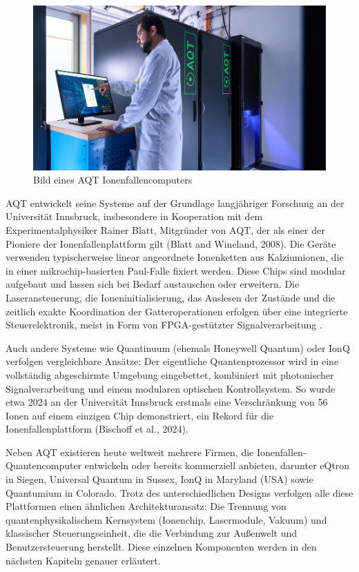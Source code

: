     \begin{figure}[ht]
    \centering
    \includegraphics[width=1\textwidth]{images/quanten-hardware/AQT.jpg}
    \caption{Bild eines AQT Ionenfallencomputers}
    \label{fig:meinbild}
    \end{figure}

AQT entwickelt seine Systeme auf der Grundlage langjähriger Forschung an der Universität Innsbruck, insbesondere in Kooperation mit dem Experimentalphysiker Rainer Blatt, Mitgründer von AQT, der als einer der Pioniere der Ionenfallenplattform gilt (Blatt and Wineland, 2008). Die Geräte verwenden typischerweise linear angeordnete Ionenketten aus Kalziumionen, die in einer mikrochip-basierten Paul-Falle fixiert werden. Diese Chips sind modular aufgebaut und lassen sich bei Bedarf austauschen oder erweitern. Die Laseransteuerung, die Ioneninitialisierung, das Auslesen der Zustände und die zeitlich exakte Koordination der Gatteroperationen erfolgen über eine integrierte Steuerelektronik, meist in Form von FPGA-gestützter Signalverarbeitung .

Auch andere Systeme wie Quantinuum (ehemals Honeywell Quantum) oder IonQ verfolgen vergleichbare Ansätze: Der eigentliche Quantenprozessor wird in eine vollständig abgeschirmte Umgebung eingebettet, kombiniert mit photonischer Signalverarbeitung und einem modularen optischen Kontrollsystem. So wurde etwa 2024 an der Universität Innsbruck erstmals eine Verschränkung von 56 Ionen auf einem einzigen Chip demonstriert, ein Rekord für die Ionenfallenplattform (Bischoff et al., 2024). 

Neben AQT existieren heute weltweit mehrere Firmen, die Ionenfallen-Quantencomputer entwickeln oder bereits kommerziell anbieten, darunter eQtron in Siegen, Universal Quantum in Sussex, IonQ in Maryland (USA) sowie Quantumium in Colorado. 
Trotz des unterschiedlichen Designs verfolgen alle diese Plattformen einen ähnlichen Architekturansatz: Die Trennung von quantenphysikalischem Kernsystem (Ionenchip, Lasermodule, Vakuum) und klassischer Steuerungseinheit, die die Verbindung zur Außenwelt und Benutzersteuerung herstellt. Diese einzelnen Komponenten werden in den nächsten Kapiteln genauer erläutert.

